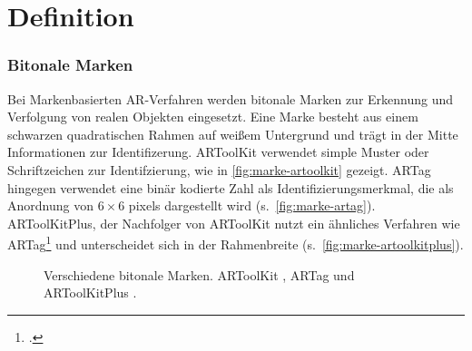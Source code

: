 \section{Definition} %
\label{sec:definition}
\begin{comment}
	Definiere Begriffe der Augmented Reality und Bildverarbeitung, die dem Leser nicht geläufig sind. Denke dabei an Prof. Klocke als Leser ohne besonderen Kenntnisstand in der AR/Bildverarbeitung.
\end{comment}

\subsubsection{Bitonale Marken}
\label{sub:bitonalemarken}
Bei Markenbasierten \gls{AR}-Verfahren werden bitonale Marken zur Erkennung und Verfolgung von realen Objekten
 eingesetzt. Eine Marke besteht aus einem schwarzen quadratischen Rahmen auf weißem Untergrund und trägt in der Mitte
 Informationen zur Identifizerung. ARToolKit verwendet simple Muster oder Schriftzeichen zur Identifzierung, wie in
 \autoref{fig:marke-artoolkit} gezeigt. ARTag hingegen verwendet eine binär kodierte Zahl als Identifizierungsmerkmal,
 die als Anordnung von $6 \times 6$ \glspl{pixel} dargestellt wird (s.~\autoref{fig:marke-artag}). ARToolKitPlus, der
 Nachfolger von ARToolKit nutzt ein ähnliches Verfahren wie ARTag\footcite[Vgl.][S.~142]{wagner07b} und unterscheidet
 sich in der Rahmenbreite (s.~\autoref{fig:marke-artoolkitplus}).

\begin{figure}[!ht]
	\centering
	\caption{
		Verschiedene bitonale Marken.
		ARToolKit , ARTag  und ARToolKitPlus .
	}
	\label{fig:bitonale-marken}
\end{figure}

\begin{comment}
	(wagner/schmalstieg ARToolKitPlus fpr Pose Tracking on Mobile Devices S.4)

	Beim Fiducial Marker Tracking werden künstliche Marken zur Erkennung und Verfolgung von realen Objekten eingesetzt. Häufig werden für diese Marken quadratische schwarze Rahmen verwendet die innerhalb des Rahmens Schriftzeichen, Bilder oder 2D Codes enthalten. Diese Marken sind einfach herzustellen und können mit geringem Aufwand an Objekte angebracht werden.

	Diese bitonale Marken haben den Vorteil, dass sie Robust gegen Helligkeitsveränderung sind und die Entscheidung eines Pixels auf eine Schwellwert-Entscheidung reduziert werden kann. Marken für \gls{AR} müssen in einem großen Blickfeld erkannt werden können, was wiederum bei industriellen Anwendung nicht der Fall ist, da hier Marken den größten Teil des Bildes einnehmen können.
\end{comment}

